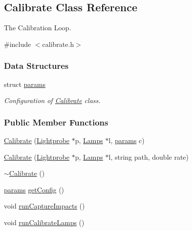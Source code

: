 \hypertarget{classCalibrate}{\subsection{\-Calibrate \-Class \-Reference}
\label{classCalibrate}
}


\-The \-Calibration \-Loop.  




{\ttfamily \#include $<$calibrate.\-h$>$}

\subsubsection*{\-Data \-Structures}
\begin{DoxyCompactItemize}
\item 
struct \hyperlink{structCalibrate_1_1params}{params}
\begin{DoxyCompactList}\small\item\em \-Configuration of \hyperlink{classCalibrate}{\-Calibrate} class. \end{DoxyCompactList}\end{DoxyCompactItemize}
\subsubsection*{\-Public \-Member \-Functions}
\begin{DoxyCompactItemize}
\item 
\hyperlink{classCalibrate_a9f1cb2fb9e76db3a4de6cc6a41f8225e}{\-Calibrate} (\hyperlink{classLightprobe}{\-Lightprobe} $\ast$p, \hyperlink{classLamps}{\-Lamps} $\ast$l, \hyperlink{structCalibrate_1_1params}{params} c)
\item 
\hyperlink{classCalibrate_ad1f6a92216d8cf4d49f1743f1e8d8cba}{\-Calibrate} (\hyperlink{classLightprobe}{\-Lightprobe} $\ast$p, \hyperlink{classLamps}{\-Lamps} $\ast$l, string path, double rate)
\item 
\hyperlink{classCalibrate_aa4cf6065d18ea089c23ba5de42f4da35}{$\sim$\-Calibrate} ()
\item 
\hyperlink{structCalibrate_1_1params}{params} \hyperlink{classCalibrate_a2050ebc8df9ad784c02b781a0634d7ca}{get\-Config} ()
\item 
void \hyperlink{classCalibrate_a4b635bcad3bf540a43fe01b47e54ad08}{run\-Capture\-Impacts} ()
\item 
void \hyperlink{classCalibrate_a9cce7906e90041efded1c24e6f5e14eb}{run\-Calibrate\-Lamps} ()
\end{DoxyCompactItemize}
